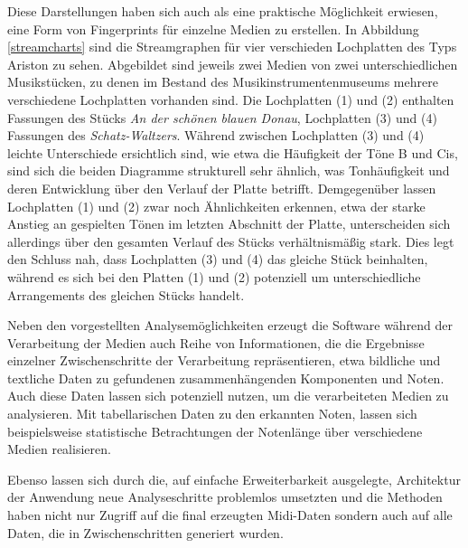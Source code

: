 Diese Darstellungen haben sich auch als eine praktische Möglichkeit erwiesen, eine Form von Fingerprints für einzelne Medien zu erstellen.
In Abbildung \ref{streamcharts} sind die Streamgraphen für vier verschieden Lochplatten des Typs Ariston zu sehen.
Abgebildet sind jeweils zwei Medien von zwei unterschiedlichen Musikstücken, zu denen im Bestand des Musikinstrumentenmuseums mehrere verschiedene Lochplatten vorhanden sind.
Die Lochplatten (1) und (2) enthalten Fassungen des Stücks \textit{An der schönen blauen Donau}, Lochplatten (3) und (4) Fassungen des \textit{Schatz-Waltzers}.
Während zwischen Lochplatten (3) und (4) leichte Unterschiede ersichtlich sind, wie etwa die Häufigkeit der Töne B und Cis, sind sich die beiden Diagramme strukturell sehr ähnlich, was Tonhäufigkeit und deren Entwicklung über den Verlauf der Platte betrifft.
Demgegenüber lassen Lochplatten (1) und (2) zwar noch Ähnlichkeiten erkennen, etwa der starke Anstieg an gespielten Tönen im letzten Abschnitt der Platte, unterscheiden sich allerdings über den gesamten Verlauf des Stücks verhältnismäßig stark.
Dies legt den Schluss nah, dass Lochplatten (3) und (4) das gleiche Stück beinhalten, während es sich bei den Platten (1) und (2) potenziell um unterschiedliche Arrangements des gleichen Stücks handelt.

Neben den vorgestellten Analysemöglichkeiten erzeugt die Software während der Verarbeitung der Medien auch Reihe von Informationen, die die Ergebnisse einzelner Zwischenschritte der Verarbeitung repräsentieren, etwa bildliche und textliche Daten zu gefundenen zusammenhängenden Komponenten und Noten.
Auch diese Daten lassen sich potenziell nutzen, um die verarbeiteten Medien zu analysieren.
Mit tabellarischen Daten zu den erkannten Noten, lassen sich beispielsweise statistische Betrachtungen der Notenlänge über verschiedene Medien realisieren.

Ebenso lassen sich durch die, auf einfache Erweiterbarkeit ausgelegte, Architektur der Anwendung neue Analyseschritte problemlos umsetzten und die Methoden haben nicht nur Zugriff auf die final erzeugten Midi-Daten sondern auch auf alle Daten, die in Zwischenschritten generiert wurden.